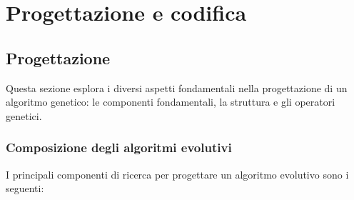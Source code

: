 \chapter{Progettazione e codifica}
\label{cap:progettazione-codifica}




\section{Progettazione}

Questa sezione esplora i diversi aspetti fondamentali nella progettazione di un algoritmo genetico: le componenti fondamentali, la struttura e gli operatori genetici.

\subsection{Composizione degli algoritmi evolutivi}

I principali componenti di ricerca per progettare un algoritmo evolutivo sono i seguenti:

